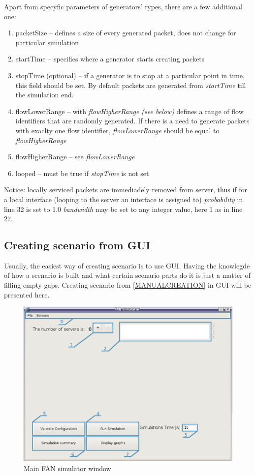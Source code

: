 \documentclass[a4paper,12pt]{article}
\begin{document}
    Apart from specyfic parameters of generators' types, there are a few
    additional one:
    \begin{enumerate}
      \item packetSize -- defines a size of every generated packet, does not
      change for particular simulation
      \item startTime -- specifies where a generator starts creating packets
      \item stopTime (optional) -- if a generator is to stop at a particular
      point in time, this field should be set. By default packets are generated
      from \emph{startTime} till the simulation end.
      \item flowLowerRange -- with \emph{flowHigherRange (see below)} defines a
      range of flow identifiers that are randomly generated. If there is a need
      to generate packets with exaclty one flow identifier,
      \emph{flowLowerRange} should be equal to \emph{flowHigherRange}
      \item flowHigherRange -- see \emph{flowLowerRange}
      \item looped -- must be true if \emph{stopTime} is not set 
    \end{enumerate}
    Notice: locally serviced packets are immediadely removed from server, thus
    if for a local interface (looping to the server an interface is assigned to)
    \emph{probability} in line 32 is set to 1.0 \emph{bandwidth} may be set to
    any integer value, here 1 as in line 27.
    
	\subsection{Creating scenario from GUI}
	Usually, the easiest way of creating scenario is to use GUI. Having the
	knowlegde of how a scenario is built and what certain scenario parts do it
	is just a matter of filling empty gaps.
	Creating scenario from \ref{MANUALCREATION} in GUI will be presented here.
	
	\begin{figure}[h]
	\includegraphics[width=150mm]{man/MainWindow.eps}
	\caption{Main FAN simulator window}
	\label{MAINWINDOW}
	\end{figure}
\end{document}
